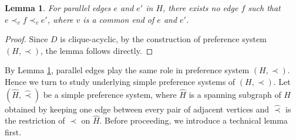 \documentclass[11pt]{article}
\newtheorem{lemma}[theorem]{Lemma}
\numberwithin{theorem}{section}
\begin{document}
\begin{lemma}
\label{lem:reduct1}
For parallel edges $e$ and $e'$ in $H$, there exists no edge $f$ such that $e\prec_v f \prec_v e'$, where $v$ is a common end of $e$ and $e'$.
\end{lemma}
\begin{proof}
Since $D$ is clique-acyclic, by the construction of preference system $(H,\prec)$, the lemma follows directly.
\end{proof}

By Lemma \ref{lem:reduct1}, parallel edges play the same role in preference system $(H,\prec)$. Hence we turn to study underlying simple preference systems of $(H,\prec)$. Let $(\hat{H},\hat\prec)$ be a simple preference system, where $\hat{H}$ is a spanning subgraph of $H$ obtained by keeping one edge between every pair of adjacent vertices and $\hat\prec$ is the restriction of $\prec$ on $\hat{H}$. Before proceeding, we introduce a technical lemma first.
\end{document}
